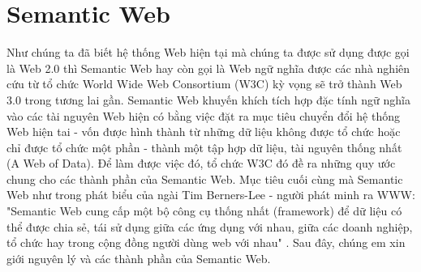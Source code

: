\section{Semantic Web}
Như chúng ta đã biết hệ thống Web hiện tại mà chúng ta được sử dụng được gọi là Web 2.0 thì Semantic Web hay còn gọi là Web ngữ nghĩa được các nhà nghiên cứu từ tổ chức World Wide Web Consortium (W3C) kỳ vọng sẽ trở thành Web 3.0 trong tương lai gần. Semantic Web khuyến khích tích hợp đặc tính ngữ nghĩa vào các tài nguyên Web hiện có bằng việc đặt ra mục tiêu chuyển đổi hệ thống Web hiện tai - vốn được hình thành từ những dữ liệu không được tổ chức hoặc chỉ được tổ chức một phần - thành một tập hợp dữ liệu, tài nguyên thống nhất (A Web of Data). Để làm được việc đó, tổ chức W3C đó đề ra những quy ước chung cho các thành phần của Semantic Web. Mục tiêu cuối cùng mà Semantic Web như trong phát biểu của ngài Tim Berners-Lee - người phát minh ra WWW: "Semantic Web cung cấp một bộ công cụ thống nhất (framework) để dữ liệu có thể được chia sẻ, tái sử dụng giữa các ứng dụng với nhau, giữa các doanh nghiệp, tổ chức hay trong cộng đồng người dùng web với nhau" \cite{semantic3}. Sau đây, chúng em xin giới nguyên lý và các thành phần của Semantic Web.
 
